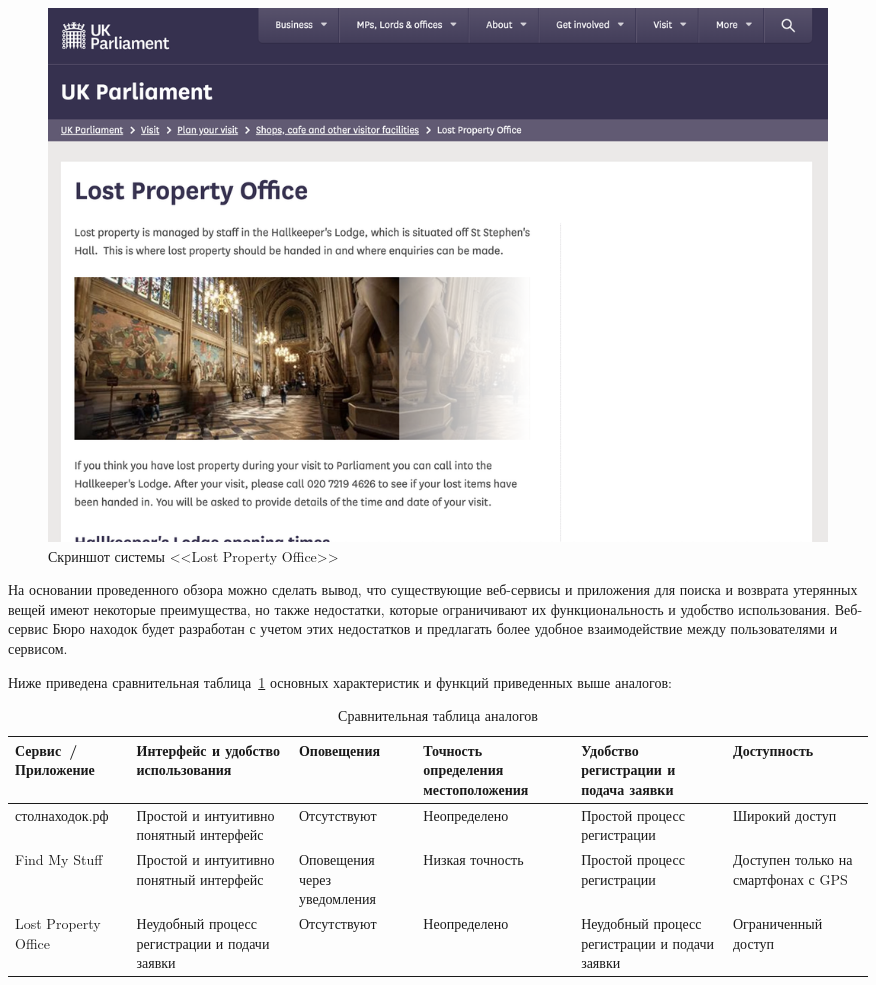 \begin{figure}[htb]
	\centering
	\includegraphics[width=.95\textwidth]{images/lostPropertyOffice}
	\parskip=6pt
	\caption{Скриншот системы <<Lost Property Office>>}
	\label{fig:lostPropertyOffice}
\end{figure}

На основании проведенного обзора можно сделать вывод, что существующие веб-сервисы и приложения для поиска и возврата утерянных вещей имеют некоторые преимущества, но также недостатки, которые ограничивают их функциональность и удобство использования. Веб-сервис Бюро находок будет разработан с учетом этих недостатков и предлагать более удобное взаимодействие между пользователями и сервисом.

Ниже приведена сравнительная таблица~\ref{tab:analogs_comparison} основных характеристик и функций приведенных выше аналогов:
\begin{table}[htb]
	\caption{Сравнительная таблица аналогов}
	\centering
	
	\emergencystretch=10pt
	\small
	\begin{tabular}{ |p{2cm}|p{3cm}|p{2cm}|p{2cm}|p{3cm}|p{2cm}| } 
		\hline
		Сервис~/ Приложение & Интерфейс и удобство использования & Опове\-ще\-ния & Точность определения местоположения & Удобство регистрации и подача заявки & Доступ\-ность \\ \hline
		
		стол\-на\-ходок.рф & Простой и интуитивно понятный интерфейс & Отсут\-ству\-ют & Не\-оп\-ре\-де\-ле\-но & Простой процесс регистрации & Широкий доступ \\ \hline
		
		Find My Stuff & Простой и интуитивно понятный интерфейс & Опо\-ве\-ще\-ния через уведомления & Низкая точность & Простой процесс регистрации & Доступен только на смартфонах с GPS \\ \hline
		
		Lost Property Office & Неудобный процесс регистрации и подачи заявки & Отсут\-ству\-ют & Не\-оп\-ре\-де\-ле\-но & Неудобный процесс регистрации и подачи заявки & Огра\-ни\-чен\-ный доступ \\ \hline
	\end{tabular}
	\label{tab:analogs_comparison}
\end{table}

